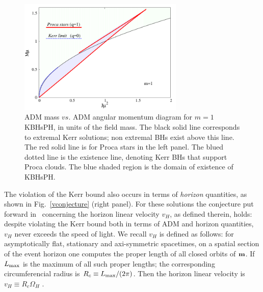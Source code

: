 \begin{figure}[h!]
  \begin{center}
    \includegraphics[width=0.7\textwidth]{papers/Proca/BH-J-M.pdf}
  \end{center}
  \caption{ADM mass $vs.$ ADM angular momentum diagram for $m=1$ KBHsPH, in units of the field mass. The black solid line corresponds to extremal Kerr solutions; non extremal BHs exist above this line. The red solid line is for Proca stars in the left panel. The blued dotted line is the existence line, denoting Kerr BHs that support Proca clouds. The blue shaded region is the domain of existence of KBHsPH.}
  \label{fig2}
\end{figure}
 

The violation of the Kerr bound also occurs in terms of \textit{horizon} quantities, as shown in Fig.~\ref{vconjecture} (right panel). For these solutions the conjecture put forward in~\cite{Herdeiro:2015moa} concerning the horizon linear velocity $v_H$, as defined therein, holds: despite violating the Kerr bound both in terms of ADM and horizon quantities, $v_H$ never exceeds the speed of light.
We recall $v_H$ is defined as follows: for asymptotically flat, stationary and axi-symmetric spacetimes, on a spatial section of the event horizon one computes the proper length of all closed orbits of ${\bf m}$.
If $L_{\rm max}$ is the maximum of all such proper lengths; the corresponding circumferencial radius is $R_c\equiv {L_{\rm max}}/({2\pi})$. 
Then the horizon linear velocity is $v_H \equiv R_c \Omega_H$ \cite{Herdeiro:2015moa}.

